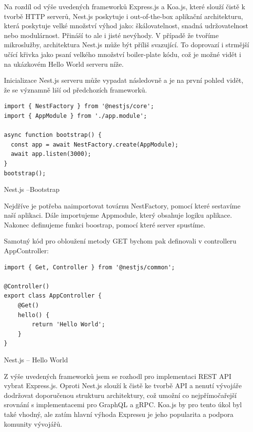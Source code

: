 \documentclass[thesis=M,czech]{FITthesis}[2019/12/23]
\begin{document}
Na rozdíl od  výše uvedených frameworků Express.js a Koa.js, které slouží čistě k tvorbě HTTP serverů, Nest.js poskytuje i out-of-the-box aplikační architekturu, která poskytuje velké množství výhod jako: škálovatelnost, snadná udržovatelnost nebo modulárnost. Přináší to ale i jisté nevýhody. V případě že tvoříme mikroslužby, architektura Nest.js může být příliš svazující. To doprovazí i strmější učící křivka jako psaní velkého množství boiler-plate kódu, což je možné vidět i na ukázkovém Hello World serveru níže. 

Inicializace Nest.js serveru může vypadat následovně a je na první pohled vidět, že se významně liší od předchozích frameworků.

\begin{listing}[H]
\begin{verbatim}
import { NestFactory } from '@nestjs/core';
import { AppModule } from './app.module';

async function bootstrap() {
  const app = await NestFactory.create(AppModule);
  await app.listen(3000);
}
bootstrap();
\end{verbatim}
\caption{Nest.js --Bootstrap}
\label{lst:nest_bootstrap}
\end{listing}

Nejdříve je potřeba naimportovat továrnu NestFactory, pomocí které sestavíme naší aplikaci. Dále importujeme Appmodule, který obsahuje logiku aplikace. Nakonec definujeme funkci boostrap, pomocí které server spustíme.

Samotný kód pro obloužení metody GET bychom pak definovali v controlleru AppController:

\begin{listing}[H]
\begin{verbatim}
import { Get, Controller } from '@nestjs/common';

@Controller()
export class AppController {
    @Get()
    hello() {
        return 'Hello World';
    }
}
\end{verbatim}
\caption{Nest.js -- Hello World}
\label{lst:nest_hello}
\end{listing}

Z výše uvedených frameworků jsem se rozhodl pro implementaci REST API vybrat Express.js. Oproti Nest.js slouží k čistě ke tvorbě API a nenutí vývojáře  dodržovat doporučenou strukturu architektury, což umožní co nejpřímočařejší srovnání s implementacemi pro GraphQL a gRPC. Koa.js by pro tento úkol byl také vhodný, ale zatím hlavní výhoda Expressu je jeho popularita a podpora komunity vývojářů.
\end{document}
